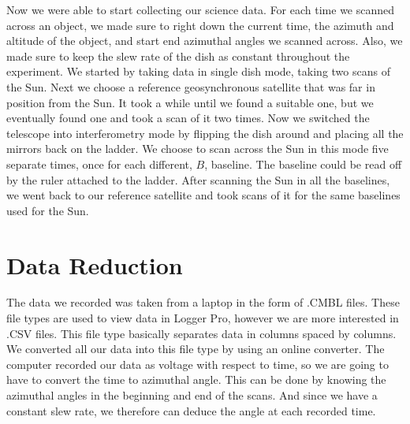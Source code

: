 \documentclass{aastex61}
\begin{document}
Now we were able to start collecting our science data. For each time we scanned across an object, we made sure to right down the current time, the azimuth and altitude of the object, and start end azimuthal angles we scanned across. Also, we made sure to keep the slew rate of the dish as constant throughout the experiment. We started by taking data in single dish mode, taking two scans of the Sun. Next we choose a reference geosynchronous satellite that was far in position from the Sun. It took a while until we found a suitable one, but we eventually found one and took a scan of it two times. Now we switched the telescope into interferometry mode by flipping the dish around and placing all the mirrors back on the ladder. We choose to scan across the Sun in this mode five separate times, once for each different, $B$, baseline. The baseline could be read off by the ruler attached to the ladder. After scanning the Sun in all the baselines, we went back to our reference satellite and took scans of it for the same baselines used for the Sun.  

\section{Data Reduction}
The data we recorded was taken from a laptop in the form of .CMBL files. These file types are used to view data in Logger Pro, however we are more interested in .CSV files. This file type basically separates data in columns spaced by columns. We converted all our data into this file type by using an online converter. The computer recorded our data as voltage with respect to time, so we are going to have to convert the time to azimuthal angle. This can be done by knowing the azimuthal angles in the beginning and end of the scans. And since we have a constant slew rate, we therefore can deduce the angle at each recorded time.
\end{document}
